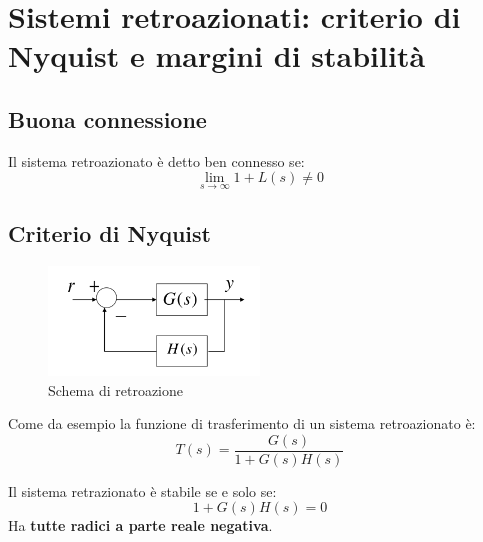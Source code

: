 \section{Sistemi retroazionati: criterio di Nyquist e margini di stabilità}

\subsection{Buona connessione}

\begin{definition}
  Il sistema retroazionato è detto ben connesso se:
  \begin{equation}
    \lim_{s\to\infty} 1 + L(s) \neq 0
  \end{equation}
\end{definition}


\subsection{Criterio di Nyquist}

\begin{figure}[h!]
  \centering
  \includegraphics[width=0.5\textwidth]{./images/retroazione.png}
  \caption{Schema di retroazione}
  \label{fig:retroazione2}
\end{figure}

Come da esempio la funzione di trasferimento di un sistema retroazionato è:
\begin{equation}
  T(s) = \frac{G(s)}{1 + G(s)H(s)}
\end{equation}


Il sistema retrazionato è stabile se e solo se:
\begin{equation}
  1 + G(s)H(s) = 0
\end{equation}
Ha \textbf{tutte radici a parte reale negativa}.




